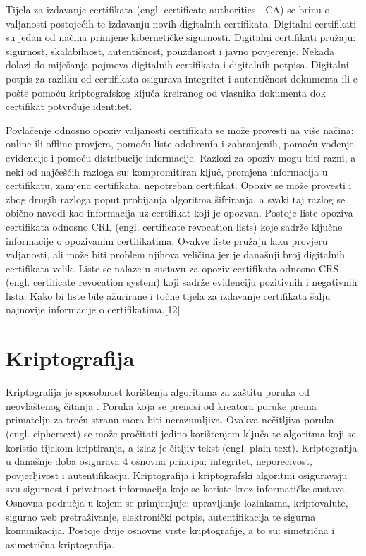 \documentclass[]{foi}
\begin{document}
Tijela za izdavanje certifikata (engl. certificate authorities - CA) se brinu o valjanosti postojećih te izdavanju novih digitalnih certifikata.
Digitalni certifikati su jedan od načina primjene kibernetičke sigurnosti.
Digitalni certifikati pružaju: sigurnost, skalabilnost, autentičnost, pouzdanost i javno povjerenje.
Nekada dolazi do miješanja pojmova digitalnih certifikata i digitalnih potpisa.
Digitalni potpis za razliku od certifikata osigurava integritet i autentičnost dokumenta ili e-pošte pomoću kriptografskog ključa kreiranog od vlasnika dokumenta dok certifikat potvrđuje identitet.

Povlačenje odnosno opoziv valjanosti certifikata se može provesti na više načina: online ili offline provjera, pomoću liste odobrenih i zabranjenih, pomoću vođenje evidencije i pomoću distribucije informacije.
Razlozi za opoziv mogu biti razni, a neki od najčešćih razloga su: kompromitiran ključ, promjena informacija u certifikatu, zamjena certifikata, nepotreban certifikat.
Opoziv se može provesti i zbog drugih razloga poput probijanja algoritma šifriranja, a svaki taj razlog se obično navodi kao informacija uz certifikat koji je opozvan.
Postoje liste opoziva certifikata odnosno CRL (engl. certificate revocation lists) koje sadrže ključne informacije o opozivanim certifikatima.
Ovakve liste pružaju laku provjeru valjanosti, ali može biti problem njihova veličina jer je današnji broj digitalnih certifikata velik.
Liste se nalaze u sustavu za opoziv certifikata odnosno CRS (engl. certificate revocation system) koji sadrže evidenciju pozitivnih i negativnih lista.
Kako bi liste bile ažurirane i točne tijela za izdavanje certifikata šalju najnovije informacije o certifikatima.[12]

\chapter{Kriptografija}

Kriptografija je sposobnost korištenja algoritama za zaštitu poruka od neovlaštenog čitanja \cite{ibm-cryptography}.
Poruka koja se prenosi od kreatora poruke prema primatelju za treću stranu mora biti nerazumljiva.
Ovakva nečitljiva poruka (engl. ciphertext) se može pročitati jedino korištenjem ključa te algoritma koji se koristio tijekom kriptiranja, a izlaz je čitljiv tekst (engl. plain text).
Kriptografija u današnje doba osigurava 4 osnovna principa: integritet, neporecivost, povjerljivost i autentifikacju.
Kriptografija i kriptografski algoritmi osiguravaju svu sigurnost i privatnost informacija koje se koriste kroz informatičke sustave.
Osnovna područja u kojem se primjenjuje: upravljanje lozinkama, kriptovalute, sigurno web pretraživanje, elektronički potpis, autentifikacija te sigurna komunikacija.
Postoje dvije osnovne vrste kriptografije, a to su: simetrična i asimetrična kriptografija.
\end{document}
